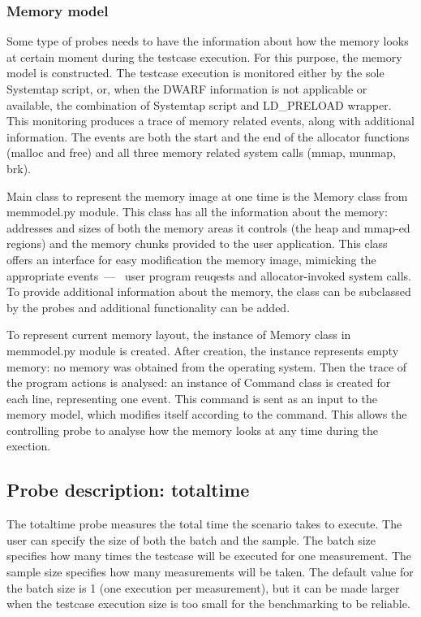\subsubsection{Memory model}
Some type of probes needs to have the information about how the memory looks at certain moment during the testcase execution. For this purpose, the memory model is constructed. The testcase execution is monitored either by the sole Systemtap script, or, when the DWARF information is not applicable or available, the combination of Systemtap script and LD\_PRELOAD wrapper. This monitoring produces a trace of memory related events, along with additional information. The events are both the start and the end of the allocator functions (malloc and free) and all three memory related system calls (mmap, munmap, brk).

Main class to represent the memory image at one time is the Memory class from memmodel.py module. This class has all the information about the memory: addresses and sizes of both the memory areas it controls (the heap and mmap-ed regions) and the memory chunks provided to the user application. This class offers an interface for easy modification the memory image, mimicking the appropriate events~---~ user program reuqests and allocator-invoked system calls. To provide additional information about the memory, the class can be subclassed by the probes and additional functionality can be added.

To represent current memory layout, the instance of Memory class in memmodel.py module is created. After creation, the instance represents empty memory: no memory was obtained from the operating system. Then the trace of the program actions is analysed: an instance of Command class is created for each line, representing one event. This command is sent as an input to the memory model, which modifies itself according to the command. This allows the controlling probe to analyse how the memory looks at any time during the exection.

\subsection{Probe description: totaltime}

The totaltime probe measures the total time the scenario takes to execute. The user can specify the size of both the batch and the sample. The batch size specifies how many times the testcase will be executed for one measurement. The sample size specifies how many measurements will be taken. The default value for the batch size is 1 (one execution per measurement), but it can be made larger when the testcase execution size is too small for the benchmarking to be reliable.

